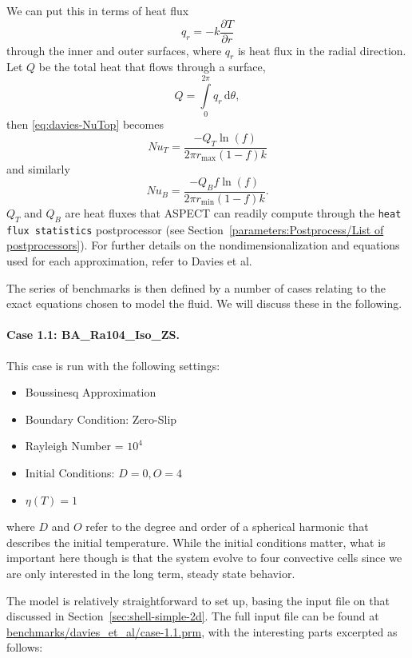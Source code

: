 \documentclass{article}
\newcommand{\aspect}{\textsc{ASPECT}}
\begin{document}
We can put this in terms of heat flux
\begin{equation*}
  q_r = -k\frac{\partial T}{\partial r}
\end{equation*}
through the inner and outer surfaces,
where $q_r$ is heat flux in the radial direction. Let $Q$ be the total heat that flows through a surface,
\begin{equation*}
  Q = \int \limits_{0}^{2\pi} q_r\, \text{d}\theta,
\end{equation*}
then \eqref{eq:davies-NuTop} becomes
\begin{equation*}
  {Nu}_{T} = \frac{-Q_{T}\ln(f)}{2\pi{r_{\max}}(1-f)k}
\end{equation*}
and similarly
\begin{equation*}
  {Nu}_{B} = \frac{-Q_{B}f\ln(f)}{2\pi{r_{\min}}(1-f)k}.
\end{equation*} 
$Q_T$ and $Q_B$ are heat fluxes that \aspect{} can readily compute through the
\texttt{heat flux statistics} postprocessor (see
Section~\ref{parameters:Postprocess/List of postprocessors}).
For further details on the nondimensionalization and equations used for each
approximation, refer to Davies et al.

The series of benchmarks is then defined by a number of cases relating to the
exact equations chosen to model the fluid. We will discuss these in the
following.


\paragraph{Case 1.1: BA\_Ra104\_Iso\_ZS.}
\label{sec:davies-case11_BA}

This case is run with the following settings:
\begin{itemize}
\item Boussinesq Approximation
\item Boundary Condition: Zero-Slip
\item Rayleigh Number = $10^4$ 
\item Initial Conditions: $D = 0, O = 4$
\item $\eta(T) = 1$
\end{itemize}
where $D$ and $O$ refer to the degree and order of a spherical harmonic that describes the 
initial temperature. While the initial conditions matter, what is important
here though is that the system evolve to four convective cells since we are
only interested in the long term, steady state behavior.

The model is relatively straightforward to set up, basing the input file on
that discussed in Section~\ref{sec:shell-simple-2d}. The full input file can
be found at \url{benchmarks/davies_et_al/case-1.1.prm}, with the interesting
parts excerpted as follows:
\end{document}
